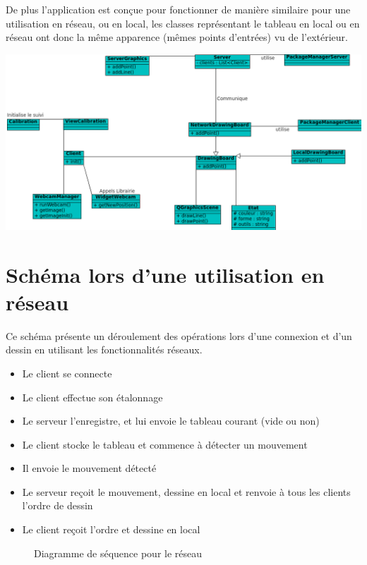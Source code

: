 \documentclass{article}
\begin{document}
De plus l'application est conçue pour fonctionner de manière similaire pour une utilisation en réseau, ou en local, les classes 
représentant le tableau en local ou en réseau ont donc la même apparence (mêmes points d'entrées) vu de l'extérieur. \\
	\begin{center}
		\includegraphics[scale=0.7]{../uml/classes.png}
	\end{center}

\section{Schéma lors d'une utilisation en réseau}
Ce schéma présente un déroulement des opérations lors d'une connexion et d'un dessin en utilisant les fonctionnalités réseaux.\\

\begin{itemize}
	\item Le client se connecte
	\item Le client effectue son étalonnage
	\item Le serveur l'enregistre, et lui envoie le tableau courant (vide ou non)
	\item Le client stocke le tableau et commence à détecter un mouvement
	\item Il envoie le mouvement détecté
	\item Le serveur reçoit le mouvement, dessine en local et renvoie à tous les clients l'ordre de dessin
	\item Le client reçoit l'ordre et dessine en local
\end{itemize}

\begin{figure}[h]
	\begin{center}
		
		\caption{Diagramme de séquence pour le réseau}
	\end{center}
\end{figure}
\end{document}
